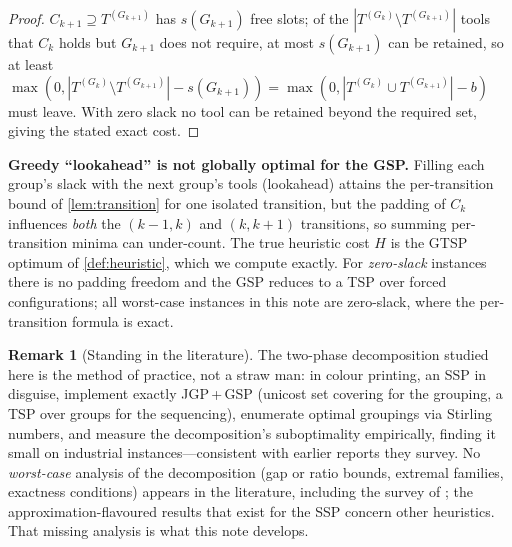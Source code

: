 \documentclass[11pt,a4paper]{article}
\theoremstyle{plain}
\theoremstyle{definition}
\newtheorem{remark}[theorem]{Remark}
\begin{document}
\begin{proofbox}
\begin{proof}
$C_{k+1}\supseteq T^{(G_{k+1})}$ has $s(G_{k+1})$ free slots; of the
$|T^{(G_k)}\setminus T^{(G_{k+1})}|$ tools that $C_k$ holds but $G_{k+1}$ does not
require, at most $s(G_{k+1})$ can be retained, so at least
$\max(0,|T^{(G_k)}\setminus T^{(G_{k+1})}|-s(G_{k+1}))=\max(0,|T^{(G_k)}\cup T^{(G_{k+1})}|-b)$
must leave. With zero slack no tool can be retained beyond the required set, giving the
stated exact cost.
\end{proof}
\end{proofbox}

\begin{warnbox}
\textbf{Greedy ``lookahead'' is not globally optimal for the GSP.}
Filling each group's slack with the next group's tools (lookahead) attains the
per-transition bound of \cref{lem:transition} for one isolated transition, but the
padding of $C_k$ influences \emph{both} the $(k\!-\!1,k)$ and $(k,k\!+\!1)$ transitions,
so summing per-transition minima can under-count. The true heuristic cost $H$ is the
GTSP optimum of \cref{def:heuristic}, which we compute exactly. For \emph{zero-slack}
instances there is no padding freedom and the GSP reduces to a TSP over forced
configurations; all worst-case instances in this note are zero-slack, where the per-transition
formula is exact.
\end{warnbox}

\begin{remark}[Standing in the literature]
\label{rem:litposition}
The two-phase decomposition studied here is the method of practice, not a straw man:
in colour printing, an SSP in disguise, \cite{Burger2015} implement exactly
JGP\,+\,GSP (unicost set covering for the grouping, a TSP over groups for the
sequencing), enumerate optimal groupings via Stirling numbers, and measure the
decomposition's suboptimality empirically, finding it small on industrial
instances---consistent with earlier reports they survey. No \emph{worst-case}
analysis of the decomposition (gap or ratio bounds, extremal families, exactness
conditions) appears in the literature, including the survey of \cite{Calmels2018};
the approximation-flavoured results that exist for the SSP concern other heuristics.
That missing analysis is what this note develops.
\end{remark}
\end{document}
